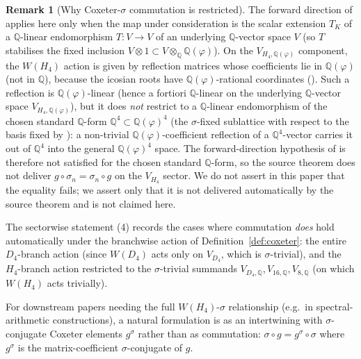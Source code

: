 \documentclass[11pt, a4paper]{amsart}
\theoremstyle{definition}
\newtheorem{remark}[theorem]{Remark}
\newcommand{\Q}{\mathbb{Q}}
\begin{document}
\begin{remark}[Why Coxeter-$\sigma$ commutation is restricted]
\label{rmk:coxeter-sigma-restricted}
The forward direction of
\cite[Theorem~\texttt{thm:pisigma-functorial}]{SigmaRationality}
applies here only when the map under consideration is the scalar
extension $T_K$ of a $\Q$-linear endomorphism $T \colon V \to V$
of an underlying $\Q$-vector space $V$ (so $T$ stabilises the
fixed inclusion $V \otimes 1 \subset V \otimes_\Q \Q(\varphi)$).
On the $V_{H_4, \Q(\varphi)}$ component, the $W(H_4)$ action is
given by reflection matrices whose coefficients lie in
$\Q(\varphi)$ (not in $\Q$), because the icosian roots have
$\Q(\varphi)$-rational coordinates
(\cite[Definitions~\texttt{def:V600},
\texttt{def:icosian-ring}]{AlgebraicSubstrate}). Such a reflection
is $\Q(\varphi)$-linear (hence a fortiori $\Q$-linear on the
underlying $\Q$-vector space $V_{H_4, \Q(\varphi)}$), but it does
\emph{not} restrict to a $\Q$-linear endomorphism of the chosen
standard $\Q$-form $\Q^4 \subset \Q(\varphi)^4$ (the
$\sigma$-fixed sublattice with respect to the basis fixed by
\cite[Definition~\texttt{def:V600}]{AlgebraicSubstrate}): a
non-trivial $\Q(\varphi)$-coefficient reflection of a
$\Q^4$-vector carries it out of $\Q^4$ into the general
$\Q(\varphi)^4$ space. The forward-direction hypothesis of
\cite[Theorem~\texttt{thm:pisigma-functorial}]{SigmaRationality}
is therefore not satisfied for the chosen standard $\Q$-form,
so the source theorem does not deliver
$g \circ \sigma_n = \sigma_n \circ g$ on the $V_{H_4}$ sector. We
do not assert in this paper that the equality fails; we assert
only that it is not delivered automatically by the source theorem
and is not claimed here.

The sectorwise statement (4) records the cases where commutation
\emph{does} hold automatically under the branchwise action of
Definition~\ref{def:coxeter}: the entire $D_4$-branch action (since
$W(D_4)$ acts only on $V_{D_4}$, which is $\sigma$-trivial), and
the $H_4$-branch action restricted to the $\sigma$-trivial summands
$V_{D_4, \Q}, V_{16, \Q}, V_{8, \Q}$ (on which $W(H_4)$ acts
trivially).

For downstream papers needing the full $W(H_4)$-$\sigma$
relationship (e.g.\ in spectral-arithmetic constructions),
a natural formulation is as an intertwining with $\sigma$-conjugate
Coxeter elements $g^\sigma$ rather than as commutation:
$\sigma \circ g = g^\sigma \circ \sigma$ where $g^\sigma$ is the
matrix-coefficient $\sigma$-conjugate of $g$.
\end{remark}
\end{document}
